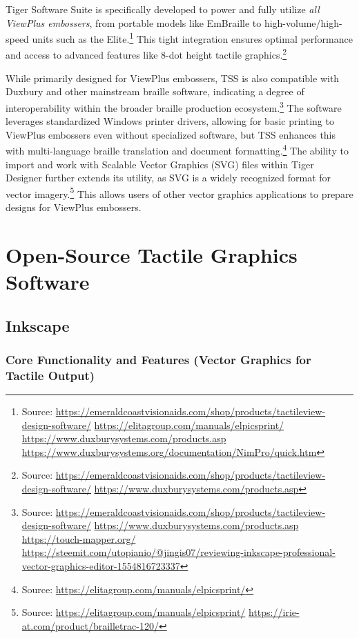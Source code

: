 Tiger Software Suite is specifically developed to power and fully utilize \emph{all ViewPlus embossers}, from portable models like EmBraille to high-volume/high-speed units such as the Elite.\footnote{Source:  \url{https://emeraldcoastvisionaids.com/shop/products/tactileview-design-software/} \url{https://elitagroup.com/manuals/elpicsprint/} \url{https://www.duxburysystems.com/products.asp} \url{https://www.duxburysystems.org/documentation/NimPro/quick.htm}} This tight integration ensures optimal performance and access to advanced features like 8-dot height tactile graphics.\footnote{Source:  \url{https://emeraldcoastvisionaids.com/shop/products/tactileview-design-software/} \url{https://www.duxburysystems.com/products.asp}}

While primarily designed for ViewPlus embossers, TSS is also compatible with Duxbury and other mainstream braille software, indicating a degree of interoperability within the broader braille production ecosystem.\footnote{Source:  \url{https://emeraldcoastvisionaids.com/shop/products/tactileview-design-software/} \url{https://www.duxburysystems.com/products.asp} \url{https://touch-mapper.org/} \url{https://steemit.com/utopianio/@jingis07/reviewing-inkscape-professional-vector-graphics-editor-1554816723337}} The software leverages standardized Windows printer drivers, allowing for basic printing to ViewPlus embossers even without specialized software, but TSS enhances this with multi-language braille translation and document formatting.\footnote{Source:  \url{https://elitagroup.com/manuals/elpicsprint/}} The ability to import and work with Scalable Vector Graphics (SVG) files within Tiger Designer further extends its utility, as SVG is a widely recognized format for vector imagery.\footnote{Source:  \url{https://elitagroup.com/manuals/elpicsprint/} \url{https://irie-at.com/product/brailletrac-120/}} This allows users of other vector graphics applications to prepare designs for ViewPlus embossers.

\section{Open-Source Tactile Graphics Software}

\subsection{Inkscape}

\subsubsection{Core Functionality and Features (Vector Graphics for Tactile Output)}

